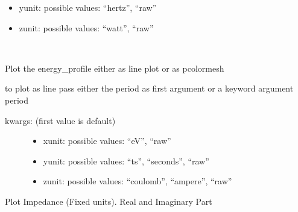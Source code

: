 \documentclass[letterpaper,10pt,openany,oneside,english]{sphinxmanual}
\begin{document}
\begin{fulllineitems}
\begin{fulllineitems}
\begin{description}
\begin{itemize}
\item {} 
yunit: possible values: “hertz”, “raw”

\item {} 
zunit: possible values: “watt”, “raw”

\end{itemize}

\end{description}

\end{fulllineitems}


\begin{fulllineitems}
\label{\detokenize{plots:plots.SimplePlotter.energy_profile}}~
\begin{DUlineblock}{0em}
\item[] Plot the energy\_profile either as line plot or as pcolormesh  
\item[] to plot as line pass either the period as first argument or a keyword argument period  
\end{DUlineblock}
\begin{description}
\item[{kwargs: (first value is default)  }] \leavevmode\begin{itemize}
\item {} 
xunit: possible values: “eV”, “raw”

\item {} 
yunit: possible values: “ts”, “seconds”, “raw”

\item {} 
zunit: possible values: “coulomb”, “ampere”, “raw”

\end{itemize}

\end{description}

\end{fulllineitems}


\begin{fulllineitems}
\label{\detokenize{plots:plots.SimplePlotter.impedance}}
Plot Impedance (Fixed units). Real and Imaginary Part

\end{fulllineitems}


\begin{fulllineitems}
\label{\detokenize{plots:plots.SimplePlotter.video}}
\end{fulllineitems}


\end{fulllineitems}
\end{document}
